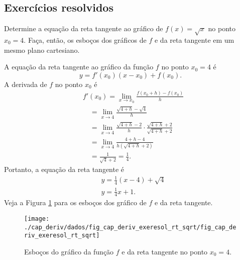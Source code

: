 \subsection{Exercícios resolvidos}

\begin{exeresol}
  Determine a equação da reta tangente ao gráfico de $f(x) = \sqrt{x}$ no ponto $x_0=4$. Faça, então, os esboços dos gráficos de $f$ e da reta tangente em um mesmo plano cartesiano.
\end{exeresol}
\begin{resol}
  A equação da reta tangente ao gráfico da função $f$ no ponto $x_0=4$ é
  \begin{equation}
    y = f'(x_0)(x-x_0)+f(x_0).
  \end{equation}
  A derivada de $f$ no ponto $x_0$ é
  \begin{align}
    & f'(x_0) = \lim_{x\to x_0} \frac{f(x_0+h)-f(x_0)}{h}\\
    & \text{}\quad = \lim_{x\to 4} \frac{\sqrt{4+h}-\sqrt{4}}{h}\\
    & \text{}\quad = \lim_{x\to 4} \frac{\sqrt{4+h}-2}{h} \cdot \frac{\sqrt{4+h}+2}{\sqrt{4+h}+2}\\
    & \text{}\quad = \lim_{x\to 4} \frac{4+h-4}{h(\sqrt{4+h}+2)}\\
    & \text{}\quad = \frac{1}{\sqrt{4}+2} = \frac{1}{4}.
  \end{align}
  Portanto, a equação da reta tangente é
  \begin{align}
    & y = \frac{1}{4}(x-4)+\sqrt{4} \\
    & y = \frac{1}{4}x+1.
  \end{align}
  Veja a Figura \ref{fig:cap_deriv_exeresol_rt_sqrt} para os esboços dos gráfico de $f$ e da reta tangente.

  \begin{figure}[H]
    \centering
    \texttt{[image: ./cap\_deriv/dados/fig\_cap\_deriv\_exeresol\_rt\_sqrt/fig\_cap\_deriv\_exeresol\_rt\_sqrt]}
    \caption{Esboços do gráfico da função $f$ e da reta tangente no ponto $x_0=4$.}
    \label{fig:cap_deriv_exeresol_rt_sqrt}
  \end{figure}
\end{resol}

